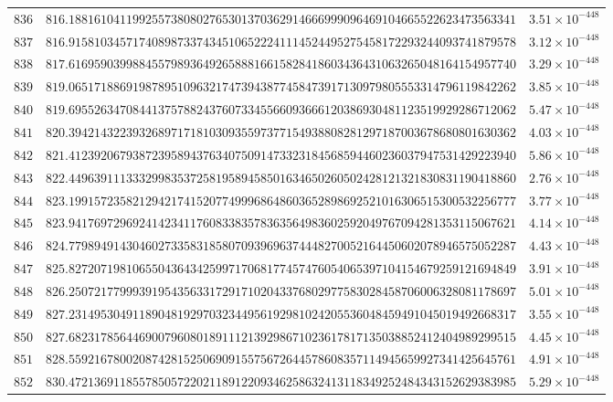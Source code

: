 \documentclass[12pt,reqno]{amsart}
\theoremstyle{remark}
\begin{document}
\begin{longtable}{clc}
$836$ & $816.1881610411992557380802765301370362914666999096469104665522623473563341$ & $3.51\times 10^{-448}$ \\
$837$ & $816.9158103457174089873374345106522241114524495275458172293244093741879578$ & $3.12\times 10^{-448}$ \\
$838$ & $817.6169590399884557989364926588816615828418603436431063265048164154957740$ & $3.29\times 10^{-448}$ \\
$839$ & $819.0651718869198789510963217473943877458473917130979805553314796119842262$ & $3.85\times 10^{-448}$ \\
$840$ & $819.6955263470844137578824376073345566093666120386930481123519929286712062$ & $5.47\times 10^{-448}$ \\
$841$ & $820.3942143223932689717181030935597377154938808281297187003678680801630362$ & $4.03\times 10^{-448}$ \\
$842$ & $821.4123920679387239589437634075091473323184568594460236037947531429223940$ & $5.86\times 10^{-448}$ \\
$843$ & $822.4496391113332998353725819589458501634650260502428121321830831190418860$ & $2.76\times 10^{-448}$ \\
$844$ & $823.1991572358212942174152077499968648603652898692521016306515300532256777$ & $3.77\times 10^{-448}$ \\
$845$ & $823.9417697296924142341176083383578363564983602592049767094281353115067621$ & $4.14\times 10^{-448}$ \\
$846$ & $824.7798949143046027335831858070939696374448270052164450602078946575052287$ & $4.43\times 10^{-448}$ \\
$847$ & $825.8272071981065504364342599717068177457476054065397104154679259121694849$ & $3.91\times 10^{-448}$ \\
$848$ & $826.2507217799939195435633172917102043376802977583028458706006328081178697$ & $5.01\times 10^{-448}$ \\
$849$ & $827.2314953049118904819297032344956192981024205536048459491045019492668317$ & $3.55\times 10^{-448}$ \\
$850$ & $827.6823178564469007960801891112139298671023617817135038852412404989299515$ & $4.45\times 10^{-448}$ \\
$851$ & $828.5592167800208742815250690915575672644578608357114945659927341425645761$ & $4.91\times 10^{-448}$ \\
$852$ & $830.4721369118557850572202118912209346258632413118349252484343152629383985$ & $5.29\times 10^{-448}$ \\

\end{longtable}
\end{document}
